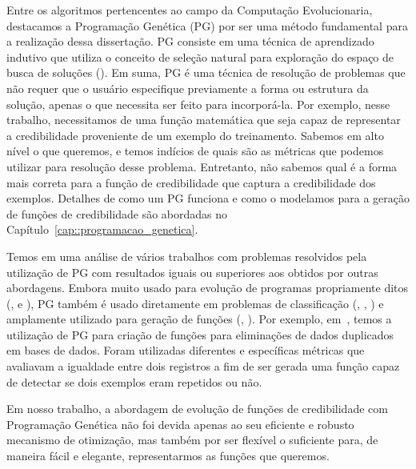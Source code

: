 Entre os algoritmos pertencentes ao campo da Computação Evolucionaria, destacamos a Programação Genética (\textsc{PG}) por ser uma método fundamental para a realização dessa dissertação. \textsc{PG} consiste em uma técnica de aprendizado indutivo que utiliza o conceito de seleção natural para exploração do espaço de busca de soluções (\cite{Koza92}).
Em suma, \textsc{PG} é uma técnica de resolução de problemas que não requer que o usuário especifique previamente a forma ou estrutura da solução, apenas o que necessita ser feito para incorporá-la.
Por exemplo, nesse trabalho, necessitamos de uma função matemática que seja capaz de representar a credibilidade proveniente de um exemplo do treinamento.
Sabemos em alto nível o que queremos, e temos indícios de quais são as métricas que podemos utilizar para resolução desse problema. Entretanto, não sabemos qual é a forma mais correta para a função de credibilidade que captura a credibilidade dos exemplos. Detalhes de como um \textsc{PG} funciona e como o modelamos para a geração de funções de credibilidade são abordadas no Capítulo~\ref{cap::programacao_genetica}.

Temos em \cite{Koza10} uma análise de vários trabalhos com problemas resolvidos pela utilização de \textsc{PG} com resultados iguais ou superiores aos obtidos por outras abordagens.
Embora muito usado para evolução de programas propriamente ditos (\cite{Spector98}, \cite{Hauptman07} e \cite{Forrest09}),
\textsc{PG} também é usado diretamente em problemas de classificação (\cite{cavaretta99}, \cite{kishore00}, \cite{freitas02}) e amplamente utilizado para geração de funções (\cite{Golubski02}, \cite{Freitas10}). 
Por exemplo, em~\cite{Freitas10}, temos a utilização de \textsc{PG} para criação de funções para eliminações de dados duplicados em bases de dados. Foram utilizadas diferentes e específicas métricas que avaliavam a igualdade entre dois registros a fim de ser gerada uma função capaz de detectar se dois exemplos eram repetidos ou não.

Em nosso trabalho, a abordagem de evolução de funções de credibilidade com Programação Genética não foi devida apenas ao seu eficiente e robusto mecanismo de otimização, mas também por ser flexível o suficiente para, de maneira fácil e elegante, representarmos as funções que queremos.



